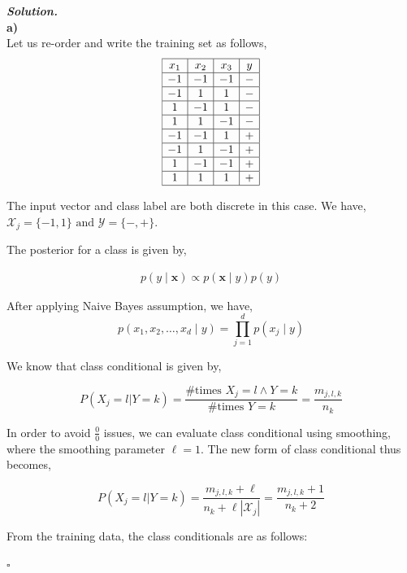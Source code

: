 \documentclass[8pt]{article}
\newenvironment{solution}[1][\it{Solution}]{\textbf{#1. } }{$\square$}
\begin{document}
\begin{solution}
\\

\textbf{a)}\\

Let us re-order and write the training set as follows,
$$
\begin{array}{|c|c|c|c|}
\hline x_{1} & x_{2} & x_{3} & y \\
\hline-1 & -1 & -1 & - \\
\hline-1 & 1 & 1 & - \\
\hline 1 & -1 & 1 & - \\
\hline 1 & 1 & -1 & - \\
\hline-1 & -1 & 1 & + \\
\hline-1 & 1 & -1 & + \\
\hline 1 & -1 & -1 & + \\
\hline 1 & 1 & 1 & + \\
\hline
\end{array}
$$

The input vector and class label are both discrete in this case. We have, $\mathcal{X}_{j} = \{-1, 1\} \text { and } \mathcal{Y} = \{-, +\}$.

The posterior for a class is given by,

$$
\begin{aligned}
p(y \mid \boldsymbol{x}) \propto p(\boldsymbol{x} \mid y) p(y)
\end{aligned}
$$

After applying Naive Bayes assumption, we have,
$$
p\left(x_{1}, x_{2}, \ldots, x_{d} \mid y\right)=\prod_{j=1}^{d} p\left(x_{j} \mid y\right)
$$

We know that class conditional is given by,

$$
    P(X_{j} = l | Y = k) = \frac{\text{\# times } X_{j} = l \wedge Y = k}{\text{\# times } Y = k} = \frac{m_{j,l,k}}{n_k}
$$

In order to avoid $\frac{0}{0}$ issues, we can evaluate class conditional using smoothing, where the smoothing parameter $\ell = 1$. The new form of class conditional thus becomes,

$$
    P(X_{j} = l | Y = k) = \frac{m_{j,l,k} + \ell}{n_k + \ell|\mathcal{X}_j|} = \frac{m_{j,l,k} + 1}{n_k + 2}
$$

From the training data, the class conditionals are as follows:


\end{solution}
\end{document}
